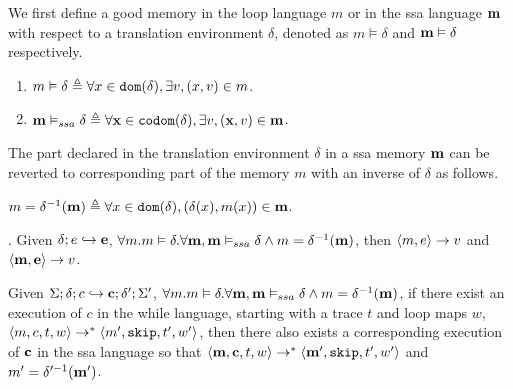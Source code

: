 \documentclass[a4paper,11pt]{article}
\begin{document}
{
	We first define a good memory in the loop language $m$ or in the ssa language $\mathbf{{m}}$ with respect to a translation environment $\delta$, denoted as $m \vDash \delta$ and $\mathbf{{m}} \vDash \delta$ respectively. 
\begin{defn} 
\begin{enumerate}
    \item $ m \vDash \delta  \triangleq \forall x \in \mathtt{dom}(\delta), \exists v, (x,v) \in m$.
    \item $ \mathbf{{m}} \vDash_{ssa} \delta  \triangleq \forall \mathbf{{x}} \in \mathtt{codom}(\delta), \exists v, (\mathbf{{x}},v) \in \mathbf{{m}}$.
\end{enumerate}
\end{defn}
%
The part declared in the translation environment $\delta$ in a ssa memory $\mathbf{{m}}$ can be reverted to corresponding part of the memory $m$ with an inverse of $\delta$ as follows.
%
\begin{defn}
 $m = \delta^{-1}(\mathbf{{m}}) \triangleq \forall x \in \mathtt{dom}(\delta), (\delta(x), m(x)) \in \mathbf{{m}} $.
\end{defn}
}
%
\begin{lem}.
\label{same_value}
{
Given $\delta; e \hookrightarrow \mathbf{{e}}$,  $\forall m. m \vDash \delta. \forall \mathbf{{m}}, \mathbf{{m}} \vDash_{ssa} \delta \land m = \delta^{-1}(\mathbf{{m}})$, then $\langle m, e \rangle \to v $ and $\langle 
\mathbf{{m}}, \mathbf{{e}} \rangle \to {v}$.
}
\end{lem}

\begin{thm}
Given $\Sigma; \delta ; c \hookrightarrow \mathbf{{c}} ; \delta';\Sigma' $, $\forall m. m \vDash \delta. \forall \mathbf{{m}}, \mathbf{{m}} \vDash_{ssa} \delta \land m = \delta^{-1}(\mathbf{{m}})$, if there exist an execution of $c$ in the while language, starting with a trace $t$ and loop maps $w$, $\langle m, c, t, w \rangle \to^{*} \langle m', \mathtt{skip}, t', w'  \rangle $,  then there also exists a corresponding execution of $\mathbf{{c}}$ in the ssa language so that 
  $\langle   {\mathbf{{m}}}, \mathbf{{c}}, t, w \rangle \to^{*} \langle {  \mathbf{{m'}}}, \mathtt{skip}, t', w'  \rangle $ and $ m' = \delta'^{-1}(\mathbf{{m'}}) $.
\end{thm}
\end{document}

